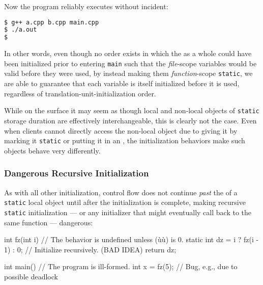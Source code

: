 \noindent Now the program reliably executes without incident:

\begin{lstlisting}[language=bash]
$ g++ a.cpp b.cpp main.cpp
$ ./a.out
$
\end{lstlisting}

\noindent In other words, even though no order exists in which the 
as a whole could have been initialized prior to entering
\lstinline!main! such that the \emph{file}-scope variables
would be valid before they were used, by instead making them
\emph{function}-scope \lstinline!static!, we are able to guarantee that
each variable is itself initialized before it is used, regardless of
translation-unit-initialization order.

While on the surface it may seem as though local and non-local objects of \lstinline!static! storage
duration are effectively interchangeable, this is clearly not the case.  Even when
clients cannot directly access the non-local object due to giving it
 by marking it \lstinline!static! or putting it in an ,
the initialization behaviors make such objects behave very differently.

\subsubsection[Dangerous Recursive Initialization]{Dangerous Recursive Initialization}\label{dangerous-recursive-initialization}

As with all other initialization, control flow does not continue
\emph{past} the  of a \lstinline!static! local object until
after the initialization is complete, making recursive \lstinline!static!
initialization --- or any initializer that might eventually call back to the same function --- dangerous:

\begin{emcppslisting}
int fz(int i)  // The behavior is undefined unless (ù{}ù) is 0.
{
    static int dz = i ? fz(i - 1) : 0;  // Initialize recursively. (BAD IDEA)
    return dz;
}

int main()  // The program is ill-formed.
{
    int x = fz(5);  // Bug, e.g., due to possible deadlock
}
\end{emcppslisting}

